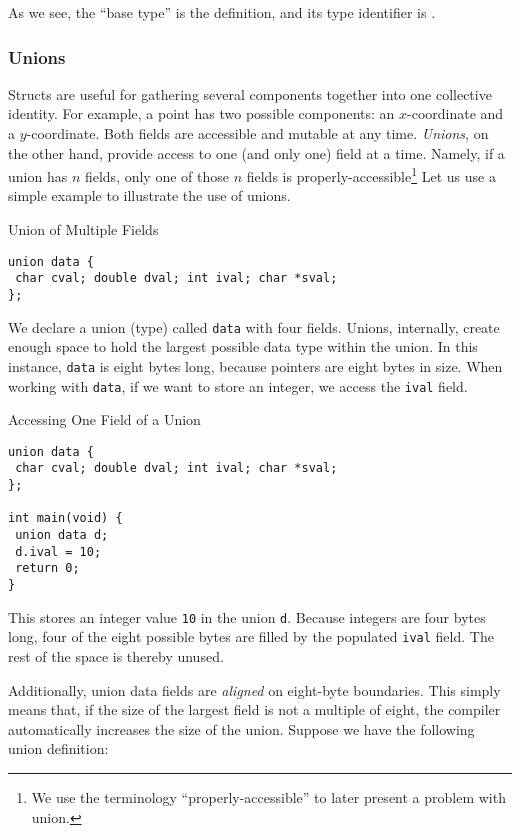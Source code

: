 As we see, the ``base type'' is the  definition, and its type identifier is . 

\subsubsection*{Unions}

Structs are useful for gathering several components together into one collective identity. For example, a point has two possible components: an $x$-coordinate and a $y$-coordinate. Both fields are accessible and mutable at any time. \textit{Unions}, on the other hand, provide access to one (and only one) field at a time. Namely, if a union has $n$ fields, only one of those $n$ fields is properly-accessible\footnote{We use the terminology ``properly-accessible'' to later present a problem with union.} Let us use a simple example to illustrate the use of unions.

\begin{cl}[main.c]{Union of Multiple Fields}\begin{lstlisting}[language=MyC]
union data {
 char cval; double dval; int ival; char *sval;
};
\end{lstlisting}\end{cl}

We declare a union (type) called \texttt{data} with four fields. Unions, internally, create enough space to hold the largest possible data type within the union. In this instance, \texttt{data} is eight bytes long, because pointers are eight bytes in size. When working with \texttt{data}, if we want to store an integer, we access the \texttt{ival} field.

\begin{cl}[main.c]{Accessing One Field of a Union}\begin{lstlisting}[language=MyC]
union data {
 char cval; double dval; int ival; char *sval;
};

int main(void) {
 union data d;
 d.ival = 10;
 return 0;
}
\end{lstlisting}\end{cl}

This stores an integer value \texttt{10} in the union \texttt{d}. Because integers are four bytes long, four of the eight possible bytes are filled by the populated \texttt{ival} field. The rest of the space is thereby unused. 

Additionally, union data fields are \textit{aligned} on eight-byte boundaries. This simply means that, if the size of the largest field is not a multiple of eight, the compiler automatically increases the size of the union. Suppose we have the following union definition:

